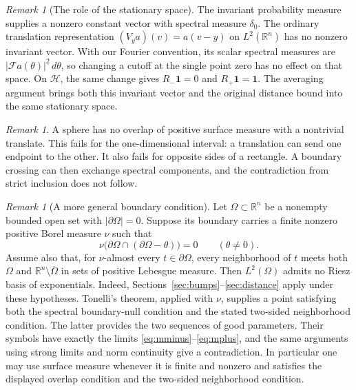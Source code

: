 \documentclass[a4paper,12pt,reqno]{amsart}
\theoremstyle{remark}
\newtheorem{remark}[theorem]{Remark}
\numberwithin{equation}{section}
\newcommand{\R}{\mathbb R}
\newcommand{\Hh}{\mathcal H}
\newcommand{\Ff}{\mathcal F}
\newcommand{\one}{\mathbf 1}
\begin{document}
\begin{remark}[The role of the stationary space]\label{rem:stationary-space}
The invariant probability measure supplies a nonzero constant vector
with spectral measure $\delta_0$. The ordinary translation representation
$(V_ya)(v)=a(v-y)$ on $L^2(\R^n)$ has no nonzero invariant vector.
With our Fourier convention, its scalar spectral measures are
$|\Ff a(\theta)|^2\,d\theta$, so changing a cutoff at the single point
zero has no effect on that space. On $\Hh$, the same change gives
$R_-\one=0$ and $R_+\one=\one$. The averaging argument brings both this
invariant vector and the original distance bound into the same stationary
space.
\end{remark}

\begin{remark}\label{rem:interval}
A sphere has no overlap of positive surface measure with a
nontrivial translate. This fails for the one-dimensional interval:
a translation can send one endpoint to the other. It also fails for
opposite sides of a rectangle. A boundary crossing can then exchange
spectral components, and the contradiction from strict inclusion does not follow.
\end{remark}

\begin{remark}[A more general boundary condition]\label{rem:general-boundary}
Let $\Omega\subset\R^n$ be a nonempty bounded open set with
$|\partial\Omega|=0$. Suppose its boundary carries a finite nonzero
positive Borel measure $\nu$ such that
\[
 \nu\bigl(\partial\Omega\cap(\partial\Omega-\theta)\bigr)=0
 \qquad(\theta\ne0).
\]
Assume also that, for $\nu$-almost every $t\in\partial\Omega$, every
neighborhood of $t$ meets both $\Omega$ and
$\R^n\setminus\overline\Omega$ in sets of positive Lebesgue measure.
Then $L^2(\Omega)$ admits no Riesz basis of exponentials.
Indeed, Sections~\ref{sec:bumps}--\ref{sec:distance} apply under these
hypotheses. Tonelli's theorem, applied with $\nu$, supplies a point satisfying both
the spectral boundary-null condition and the stated two-sided
neighborhood condition. The latter provides the two sequences of good
parameters. Their symbols
have exactly the limits \eqref{eq:mminus}--\eqref{eq:mplus}, and the same
arguments using strong limits and norm continuity give a contradiction.
In particular one may use surface measure whenever it is finite and
nonzero and satisfies the displayed overlap condition and the two-sided neighborhood condition.
\end{remark}
\end{document}

